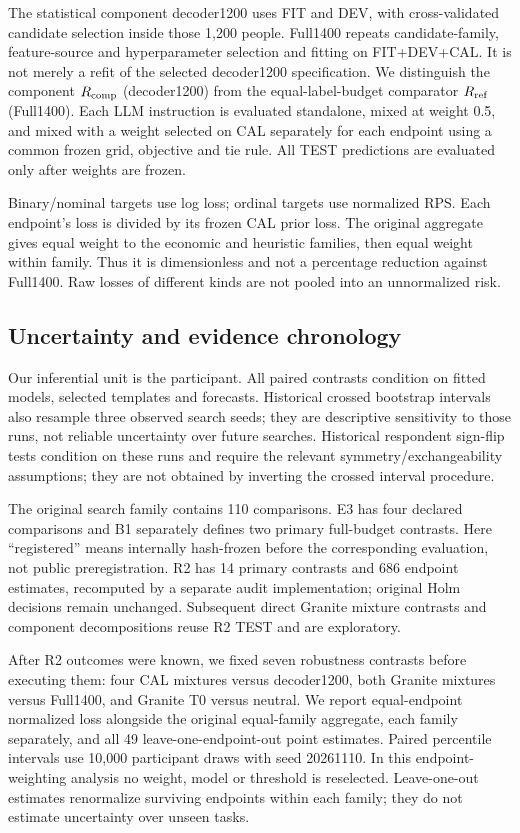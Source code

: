 \documentclass[11pt]{article}
\begin{document}
The statistical component decoder1200 uses FIT and DEV, with cross-validated candidate selection inside those 1,200 people. Full1400 repeats candidate-family, feature-source and hyperparameter selection and fitting on FIT+DEV+CAL. It is not merely a refit of the selected decoder1200 specification. We distinguish the component $R_{\rm comp}$ (decoder1200) from the equal-label-budget comparator $R_{\rm ref}$ (Full1400). Each LLM instruction is evaluated standalone, mixed at weight 0.5, and mixed with a weight selected on CAL separately for each endpoint using a common frozen grid, objective and tie rule. All TEST predictions are evaluated only after weights are frozen.

Binary/nominal targets use log loss; ordinal targets use normalized RPS. Each endpoint's loss is divided by its frozen CAL prior loss. The original aggregate gives equal weight to the economic and heuristic families, then equal weight within family. Thus it is dimensionless and not a percentage reduction against Full1400. Raw losses of different kinds are not pooled into an unnormalized risk.

\subsection{Uncertainty and evidence chronology}
Our inferential unit is the participant. All paired contrasts condition on fitted models, selected templates and forecasts. Historical crossed bootstrap intervals also resample three observed search seeds; they are descriptive sensitivity to those runs, not reliable uncertainty over future searches. Historical respondent sign-flip tests condition on these runs and require the relevant symmetry/exchangeability assumptions; they are not obtained by inverting the crossed interval procedure.

The original search family contains 110 comparisons. E3 has four declared comparisons and B1 separately defines two primary full-budget contrasts. Here ``registered'' means internally hash-frozen before the corresponding evaluation, not public preregistration. R2 has 14 primary contrasts and 686 endpoint estimates, recomputed by a separate audit implementation; original Holm decisions remain unchanged. Subsequent direct Granite mixture contrasts and component decompositions reuse R2 TEST and are exploratory.

After R2 outcomes were known, we fixed seven robustness contrasts before executing them: four CAL mixtures versus decoder1200, both Granite mixtures versus Full1400, and Granite T0 versus neutral. We report equal-endpoint normalized loss alongside the original equal-family aggregate, each family separately, and all 49 leave-one-endpoint-out point estimates. Paired percentile intervals use 10,000 participant draws with seed 20261110. In this endpoint-weighting analysis no weight, model or threshold is reselected. Leave-one-out estimates renormalize surviving endpoints within each family; they do not estimate uncertainty over unseen tasks.
\end{document}
